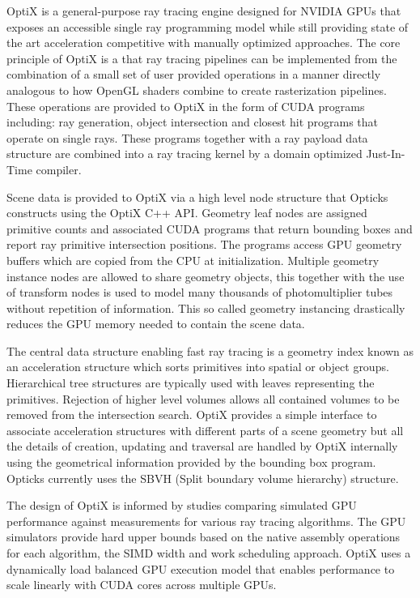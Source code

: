 \documentclass[a4paper]{jpconf}
\begin{document}
OptiX\cite{optixPaper} \cite{optixSite} is a general-purpose ray tracing engine 
designed for NVIDIA GPUs that exposes an accessible single ray programming model 
while still providing state of the art acceleration competitive with 
manually optimized approaches\cite{understanding}\cite{understandingAddendum}.  
%
The core principle of OptiX is a that ray tracing pipelines can be implemented 
from the combination of a small set of user provided operations
in a manner directly analogous to how OpenGL shaders combine to create rasterization pipelines.
These operations are provided to OptiX in the form of CUDA programs 
including: ray generation, object intersection and closest hit programs that operate on 
single rays. These programs together with a ray payload data structure are combined 
into a ray tracing kernel by a domain optimized Just-In-Time compiler.

Scene data is provided to OptiX via a high level node structure that 
Opticks constructs using the OptiX C++ API. 
Geometry leaf nodes are assigned primitive counts 
and associated CUDA programs that return bounding boxes and 
report ray primitive intersection positions. 
The programs access GPU geometry buffers which are copied from the CPU at initialization.
Multiple geometry instance nodes are allowed to share geometry objects, this 
together with the use of transform nodes is used to model many thousands of  
photomultiplier tubes without repetition of information. This so called geometry 
instancing drastically reduces the GPU memory needed to contain the scene data.

The central data structure enabling fast ray tracing is a geometry index
known as an acceleration structure which sorts primitives 
into spatial or object groups. 
Hierarchical tree structures are typically used
with leaves representing the primitives.  Rejection of higher level
volumes allows all contained volumes to be removed from the intersection
search. OptiX provides a simple interface to associate acceleration structures 
with different parts of a scene geometry but all the details of creation, updating 
and traversal are handled by OptiX internally using the geometrical information provided by the 
bounding box program. Opticks currently uses the SBVH (Split boundary volume hierarchy) structure\cite{sbvh}.

The design of OptiX is informed by studies\cite{understanding}\cite{understandingAddendum}
comparing simulated GPU performance against measurements
for various ray tracing algorithms. The GPU simulators 
provide hard upper bounds based on the native assembly operations
for each algorithm, the SIMD width and work scheduling approach. 
OptiX uses a dynamically load balanced GPU execution model that enables
performance to scale linearly with CUDA cores across multiple GPUs. 
\end{document}

